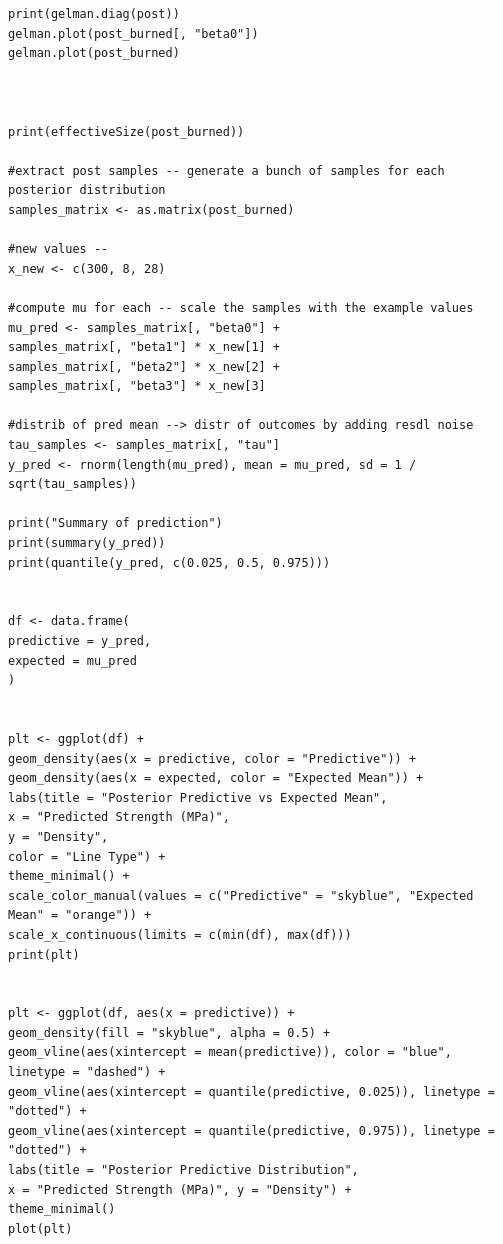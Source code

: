 \documentclass[]{article}
\begin{document}
\begin{lstlisting}
print(gelman.diag(post))
gelman.plot(post_burned[, "beta0"])
gelman.plot(post_burned)



print(effectiveSize(post_burned))

#extract post samples -- generate a bunch of samples for each posterior distribution
samples_matrix <- as.matrix(post_burned)

#new values --
x_new <- c(300, 8, 28)

#compute mu for each -- scale the samples with the example values
mu_pred <- samples_matrix[, "beta0"] +
samples_matrix[, "beta1"] * x_new[1] +
samples_matrix[, "beta2"] * x_new[2] +
samples_matrix[, "beta3"] * x_new[3]

#distrib of pred mean --> distr of outcomes by adding resdl noise
tau_samples <- samples_matrix[, "tau"]
y_pred <- rnorm(length(mu_pred), mean = mu_pred, sd = 1 / sqrt(tau_samples))

print("Summary of prediction")
print(summary(y_pred))
print(quantile(y_pred, c(0.025, 0.5, 0.975)))


df <- data.frame(
predictive = y_pred,
expected = mu_pred
)


plt <- ggplot(df) +
geom_density(aes(x = predictive, color = "Predictive")) +
geom_density(aes(x = expected, color = "Expected Mean")) +
labs(title = "Posterior Predictive vs Expected Mean",
x = "Predicted Strength (MPa)",
y = "Density",
color = "Line Type") +
theme_minimal() +
scale_color_manual(values = c("Predictive" = "skyblue", "Expected Mean" = "orange")) +
scale_x_continuous(limits = c(min(df), max(df)))
print(plt)


plt <- ggplot(df, aes(x = predictive)) +
geom_density(fill = "skyblue", alpha = 0.5) +
geom_vline(aes(xintercept = mean(predictive)), color = "blue", linetype = "dashed") +
geom_vline(aes(xintercept = quantile(predictive, 0.025)), linetype = "dotted") +
geom_vline(aes(xintercept = quantile(predictive, 0.975)), linetype = "dotted") +
labs(title = "Posterior Predictive Distribution",
x = "Predicted Strength (MPa)", y = "Density") +
theme_minimal()
plot(plt)	
\end{lstlisting}
\end{document}
